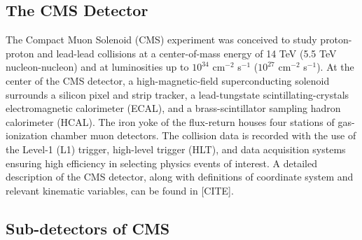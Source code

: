 \documentclass{article}
\begin{document}
\subsection{The CMS Detector}
The Compact Muon Solenoid (CMS) experiment was conceived to study proton-proton and lead-lead collisions at a center-of-mass energy of 14 TeV (5.5 TeV nucleon-nucleon) and at luminosities up to $10^{34}$ cm$^{-2}$ s$^{-1}$ ($10^{27}$ cm$^{-2}$ s$^{-1}$). At the center of the CMS detector, a high-magnetic-field superconducting solenoid surrounds a silicon pixel and strip tracker, a lead-tungstate scintillating-crystals electromagnetic calorimeter (ECAL), and a brass-scintillator sampling hadron calorimeter (HCAL). The iron yoke of the flux-return houses four stations of gas-ionization chamber muon detectors. The collision data is recorded with the use of the Level-1 (L1) trigger, high-level trigger (HLT), and data acquisition systems ensuring high efficiency in selecting physics events of interest. A detailed description of the CMS detector, along with definitions of coordinate system and relevant kinematic variables, can be found in [CITE].

\subsection{Sub-detectors of CMS}
\end{document}
